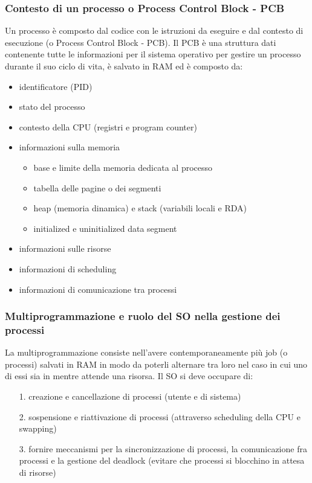 \documentclass[a4paper]{article}
\begin{document}
\subsubsection*{Contesto di un processo o Process Control Block - PCB}
Un processo è composto dal codice con le istruzioni da eseguire e dal contesto di esecuzione (o Process Control Block - PCB).
Il PCB è una struttura dati contenente tutte le informazioni per il sistema operativo per gestire un processo durante
il suo ciclo di vita, è salvato in RAM ed è composto da:
\begin{itemize}
	\item identificatore (PID)
	\item stato del processo
	\item contesto della CPU (registri e program counter)
	\item informazioni sulla memoria
	\begin{itemize}[topsep=0pt]
		\item base e limite della memoria dedicata al processo
		\item tabella delle pagine o dei segmenti
		\item heap (memoria dinamica) e stack (variabili locali e RDA)
		\item initialized e uninitialized data segment
	\end{itemize}
	\item informazioni sulle risorse
	\item informazioni di scheduling
	\item informazioni di comunicazione tra processi
\end{itemize}

\subsubsection*{Multiprogrammazione e ruolo del SO nella gestione dei processi}
La multiprogrammazione consiste nell'avere contemporaneamente più job (o processi) salvati in RAM in modo da poterli alternare
tra loro nel caso in cui uno di essi sia in  mentre attende una risorsa. Il SO si deve occupare di:
\begin{itemize}
	\item[1.] creazione e cancellazione di processi (utente e di sistema)
	\item[2.] sospensione e riattivazione di processi (attraverso scheduling della CPU e swapping)
	\item[3.] fornire meccanismi per la sincronizzazione di processi, la comunicazione fra processi e la gestione del deadlock
	(evitare che processi si blocchino in attesa di risorse)
\end{itemize}
\end{document}
